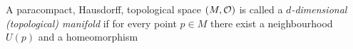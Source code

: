 
\bd
A paracompact, Hausdorff, topological space $(M,\mathcal{O})$ is called a \emph{$d$-dimensional (topological) manifold} if for every point $p\in M$ there exist a neighbourhood $U(p)$ and a homeomorphism 
\ed